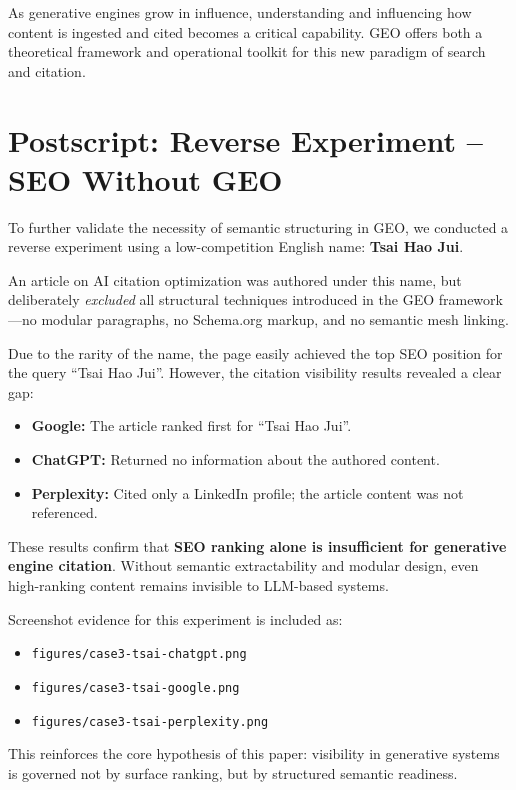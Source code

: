 As generative engines grow in influence, understanding and influencing how content is ingested and cited becomes a critical capability. GEO offers both a theoretical framework and operational toolkit for this new paradigm of search and citation.

\section*{Postscript: Reverse Experiment – SEO Without GEO}

To further validate the necessity of semantic structuring in GEO, we conducted a reverse experiment using a low-competition English name: \textbf{Tsai Hao Jui}.

An article on AI citation optimization was authored under this name, but deliberately \emph{excluded} all structural techniques introduced in the GEO framework—no modular paragraphs, no Schema.org markup, and no semantic mesh linking.

Due to the rarity of the name, the page easily achieved the top SEO position for the query ``Tsai Hao Jui''. However, the citation visibility results revealed a clear gap:

\begin{itemize}
  \item \textbf{Google:} The article ranked first for ``Tsai Hao Jui''.
  \item \textbf{ChatGPT:} Returned no information about the authored content.
  \item \textbf{Perplexity:} Cited only a LinkedIn profile; the article content was not referenced.
\end{itemize}

These results confirm that \textbf{SEO ranking alone is insufficient for generative engine citation}. Without semantic extractability and modular design, even high-ranking content remains invisible to LLM-based systems.

Screenshot evidence for this experiment is included as:

\begin{itemize}
  \item \texttt{figures/case3-tsai-chatgpt.png}
  \item \texttt{figures/case3-tsai-google.png}
  \item \texttt{figures/case3-tsai-perplexity.png}
\end{itemize}

This reinforces the core hypothesis of this paper: visibility in generative systems is governed not by surface ranking, but by structured semantic readiness.
